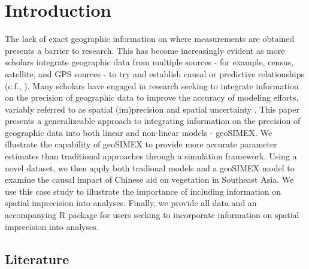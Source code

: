 \section{Introduction}
The lack of exact geographic information on where measurements are obtained presents a barrier to research.
This has become increasingly evident as more scholars integrate geographic data from multiple sources - for example, census, satellite, and GPS sources - to try and establish causal or predictive relationships (c.f., \cite{bare_assessing_2015,buntaine_titling_2015,gallo_mapping_2012,andam_measuring_2008}).
Many scholars have engaged in research seeking to integrate information on the precision of geographic data to improve the accuracy of modeling efforts, variably referred to as spatial (im)precision and spatial uncertainty \cite{worboys_imprecision_????,aerts_accounting_2003,ogryczak_efficient_2009}.
This paper presents a generalizeable approach to integrating information on the precision of geographic data into both linear and non-linear models - geoSIMEX.
We illustrate the capability of geoSIMEX to provide more accurate parameter estimates than traditional approaches through a simulation framework. 
Using a novel dataset, we then apply both tradional models and a geoSIMEX model to examine the causal impact of Chinese aid on vegetation in Southeast Asia.
We use this case study to illustrate the importance of including information on spatial imprecision into analyses.
Finally, we provide all data and an accompanying R package for users seeking to incorporate information on spatial imprecision into analyses.

\subsection{Literature}

